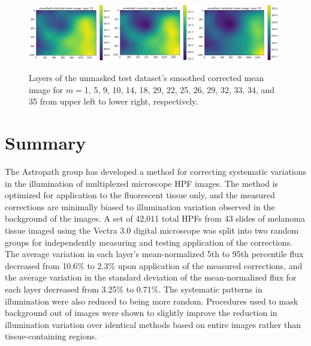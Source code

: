 \documentclass[letterpaper,11pt]{article}
\begin{document}
\begin{figure}[!ht]
\includegraphics[width=0.32\textwidth]{images/results/unmasked_smoothed_corrected_mean_image_layers/unmasked_smoothed_corrected_mean_image_layer_33}
\includegraphics[width=0.32\textwidth]{images/results/unmasked_smoothed_corrected_mean_image_layers/unmasked_smoothed_corrected_mean_image_layer_34}
\includegraphics[width=0.32\textwidth]{images/results/unmasked_smoothed_corrected_mean_image_layers/unmasked_smoothed_corrected_mean_image_layer_35}
\caption{\footnotesize Layers of the unmasked test dataset's smoothed corrected mean image for $m=$1, 5, 9, 10, 14, 18, 29, 22, 25, 26, 29, 32, 33, 34, and 35 from upper left to lower right, respectively.}
\label{fig:unmasked_smoothed_corrected_mean_image_layers_vectra}
\end{figure}

\section{Summary}
\label{sec:summary}

The Astropath group has developed a method for correcting systematic variations in the illumination of multiplexed microscope HPF images. The method is optimized for application to the fluorescent tissue only, and the measured corrections are minimally biased to illumination variation observed in the background of the images. A set of 42,011 total HPFs from 43 slides of melanoma tissue imaged using the Vectra 3.0 digital microscope was split into two random groups for independently measuring and testing application of the corrections. The average variation in each layer's mean-normalized 5th to 95th percentile flux decreased from 10.6\% to 2.3\% upon application of the measured corrections, and the average variation in the standard deviation of the mean-normalized flux for each layer decreased from 3.25\% to 0.71\%. The systematic patterns in illumination were also reduced to being more random. Procedures used to mask background out of images were shown to slightly improve the reduction in illumination variation over identical methods based on entire images rather than tissue-containing regions.

\clearpage

\end{document}
